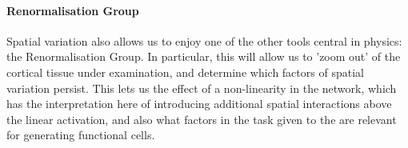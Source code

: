 \documentclass[../main.tex]{subfiles}
\begin{document}
\paragraph{Renormalisation Group}

Spatial variation also allows us to enjoy one of the other tools central in physics: the Renormalisation Group. In particular, this will allow us to 'zoom out' of the cortical tissue under examination, and determine which factors of spatial variation persist. This lets us  the effect of a non-linearity in the network, which has the interpretation here of introducing additional spatial interactions above the linear activation, and also  what factors in the task given to the  are relevant for generating functional cells.
\end{document}
